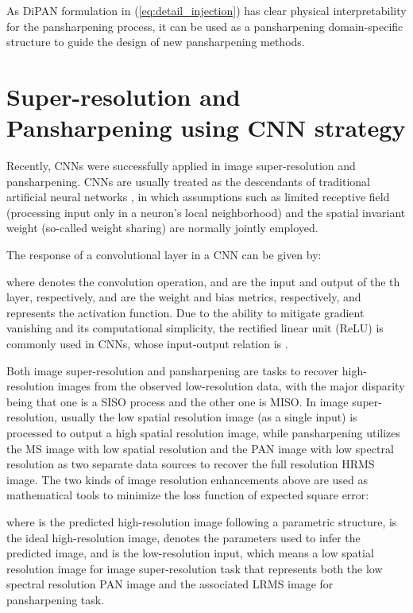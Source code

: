 \documentclass[journal]{IEEEtran}
\begin{document}
As DiPAN formulation in (\ref{eq:detail_injection}) has clear physical interpretability for the pansharpening process, it can be used as a pansharpening domain-specific structure to guide the design of new pansharpening methods.

\section{Super-resolution and Pansharpening using CNN strategy \label{sec:SuperPanMethods}}

Recently, CNNs were successfully applied in image super-resolution and pansharpening. CNNs are usually treated as the descendants of traditional artificial neural networks \cite{CNN:Fukushima1988,CNN:Lecun1989,CNN:Lecun1998}, in which assumptions such as limited receptive field (processing input only in a neuron's local neighborhood) and the spatial invariant weight (so-called weight sharing) are normally jointly employed.

The response of a convolutional layer in a CNN can be given by:

where  denotes the convolution operation,  and  are the input and output of the th layer, respectively,  and  are the weight and bias metrics, respectively, and  represents the activation function.
Due to the ability to mitigate gradient vanishing and its computational simplicity, the rectified linear unit (ReLU) \cite{Nair2010Rectified} is commonly used in CNNs, whose input-output relation is  \cite{CNN-Hyperspectral:Hu2015,SuperRes-CNN:Dong2016,CNN-Hyperspectral:Chen2016,CNN-Multiscale:Jia2017}.

Both image super-resolution and pansharpening are tasks to recover high-resolution images from the observed low-resolution data, with the major disparity being that one is a SISO process and the other one is MISO. In image super-resolution, usually the low spatial resolution image (as a single input) is processed to output a high spatial resolution image, while pansharpening utilizes the MS image with low spatial resolution and the PAN image with low spectral resolution as two separate data sources to recover the full resolution HRMS image. The two kinds of image resolution enhancements above are used as mathematical tools to minimize the loss function of expected square error:

where  is the predicted high-resolution image following a parametric structure,  is the ideal high-resolution image,  denotes the parameters used to infer the predicted image, and  is the low-resolution input, which means a low spatial resolution image for image super-resolution task that represents both the low spectral resolution PAN image and the associated LRMS image for pansharpening task.
\end{document}
